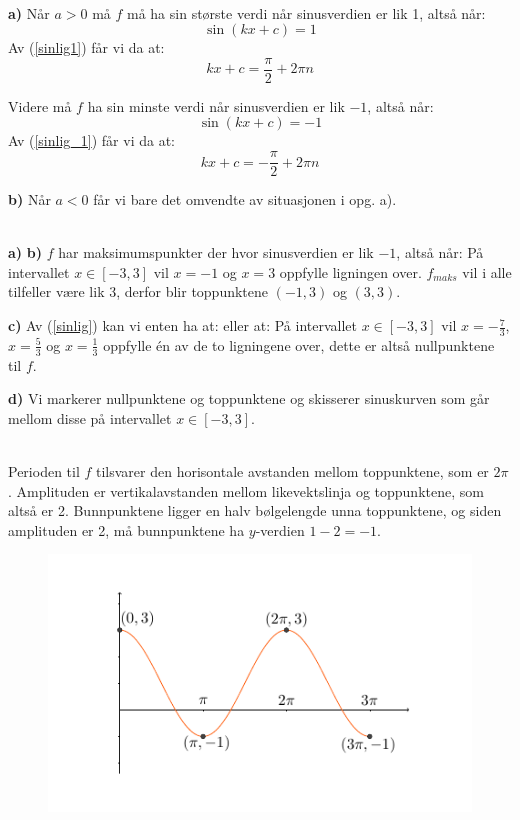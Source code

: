 \\
\textbf{a)} Når $ a>0 $ må $ f $ må ha sin største verdi når sinusverdien er lik 1, altså når:
\[ \sin(kx + c) = 1 \]
Av (\ref{sinlig1}) får vi da at:
\[ kx +c = \frac{\pi}{2}+ 2\pi n \]

Videre må $ f $ ha sin minste verdi når sinusverdien er lik $ -1 $, altså når:
\[ \sin(kx + c) = -1 \]
Av (\ref{sinlig_1}) får vi da at:
\[ kx +c = -\frac{\pi}{2}+2\pi n \]

\textbf{b)} Når $ a<0 $ får vi bare det omvendte av situasjonen i opg. a).\vsk 

\\
\textbf{a)} 
\textbf{b)} $ f $ har maksimumspunkter der hvor sinusverdien er lik $ -1 $, altså når:
På intervallet $ x\in[-3, 3] $ vil $ x=-1 $ og $ x=3 $ oppfylle ligningen over. $ f_{maks} $ vil i alle tilfeller være lik 3, derfor blir toppunktene $ (-1, 3) $ og $ (3, 3) $.\vsk

\textbf{c)} 
Av (\ref{sinlig}) kan vi enten ha at:
eller at:
På intervallet $ x\in[-3, 3] $ vil $ x=-\frac{7}{3} $, $ x=\frac{5}{3} $ og $ x=\frac{1}{3} $ oppfylle én av de to ligningene over, dette er altså nullpunktene til $ f $.

\textbf{d)} Vi markerer nullpunktene og toppunktene og skisserer sinuskurven som går mellom disse på intervallet $ x\in[-3, 3] $.\vsk

\\
Perioden til $ f $ tilsvarer den horisontale avstanden mellom toppunktene, som er $ 2\pi $. Amplituden er vertikalavstanden mellom likevektslinja og toppunktene, som altså er 2. Bunnpunktene ligger en halv bølgelengde unna toppunktene, og siden amplituden er 2, må bunnpunktene ha $ y $-verdien $ 1-2=-1 $.\vs
\begin{figure}
	\centering
	\includegraphics[]{skissin}
\end{figure}

